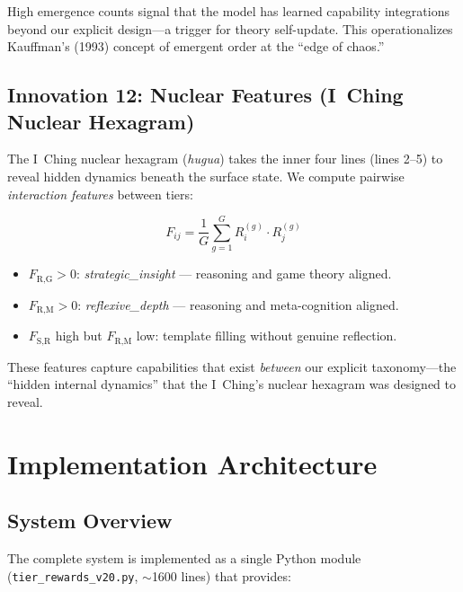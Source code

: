 \documentclass{article}
\begin{document}
High emergence counts signal that the model has learned capability integrations beyond our explicit design---a trigger for theory self-update. This operationalizes Kauffman's (1993) concept of emergent order at the ``edge of chaos.''

\subsection{Innovation 12: Nuclear Features (I~Ching Nuclear Hexagram)}

The I~Ching nuclear hexagram (\emph{hugua}) takes the inner four lines (lines 2--5) to reveal hidden dynamics beneath the surface state. We compute pairwise \emph{interaction features} between tiers:

\begin{equation}
    F_{ij} = \frac{1}{G} \sum_{g=1}^{G} R_i^{(g)} \cdot R_j^{(g)}
\end{equation}

\begin{itemize}
    \item $F_{\text{R,G}} > 0$: \emph{strategic\_insight} --- reasoning and game theory aligned.
    \item $F_{\text{R,M}} > 0$: \emph{reflexive\_depth} --- reasoning and meta-cognition aligned.
    \item $F_{\text{S,R}}$ high but $F_{\text{R,M}}$ low: template filling without genuine reflection.
\end{itemize}

These features capture capabilities that exist \emph{between} our explicit taxonomy---the ``hidden internal dynamics'' that the I~Ching's nuclear hexagram was designed to reveal.

\section{Implementation Architecture}

\subsection{System Overview}

The complete system is implemented as a single Python module (\texttt{tier\_rewards\_v20.py}, $\sim$1600 lines) that provides:
\end{document}
